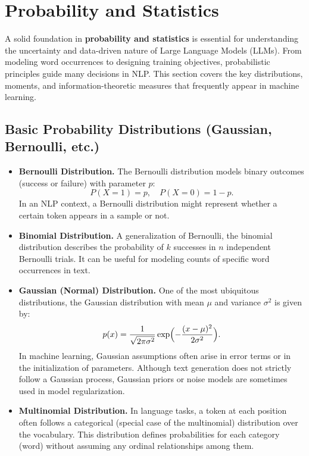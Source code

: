 \section{Probability and Statistics}
\label{sec:probability}

\noindent
A solid foundation in \textbf{probability and statistics} is essential for understanding the uncertainty and data-driven nature of Large Language Models (LLMs). From modeling word occurrences to designing training objectives, probabilistic principles guide many decisions in NLP. This section covers the key distributions, moments, and information-theoretic measures that frequently appear in machine learning.

\subsection{Basic Probability Distributions (Gaussian, Bernoulli, etc.)}
\noindent
\begin{itemize}
    \item \textbf{Bernoulli Distribution.}
    The Bernoulli distribution models binary outcomes (success or failure) with parameter $p$:
    \begin{equation}\label{eq:bernoulli}
    P(X = 1) = p, \quad P(X = 0) = 1-p.
    \end{equation}
    In an NLP context, a Bernoulli distribution might represent whether a certain token appears in a sample or not.

    \item \textbf{Binomial Distribution.}
    A generalization of Bernoulli, the binomial distribution describes the probability of $k$ successes in $n$ independent Bernoulli trials. It can be useful for modeling counts of specific word occurrences in text.

    \item \textbf{Gaussian (Normal) Distribution.}
    One of the most ubiquitous distributions, the Gaussian distribution with mean $\mu$ and variance $\sigma^2$ is given by:
    \[
    p(x) = \frac{1}{\sqrt{2 \pi \sigma^2}} \exp\Bigl(-\frac{(x-\mu)^2}{2 \sigma^2}\Bigr).
    \]
    In machine learning, Gaussian assumptions often arise in error terms or in the initialization of parameters. Although text generation does not strictly follow a Gaussian process, Gaussian priors or noise models are sometimes used in model regularization.

    \item \textbf{Multinomial Distribution.}
    In language tasks, a token at each position often follows a categorical (special case of the multinomial) distribution over the vocabulary. This distribution defines probabilities for each category (word) without assuming any ordinal relationships among them.
\end{itemize}

